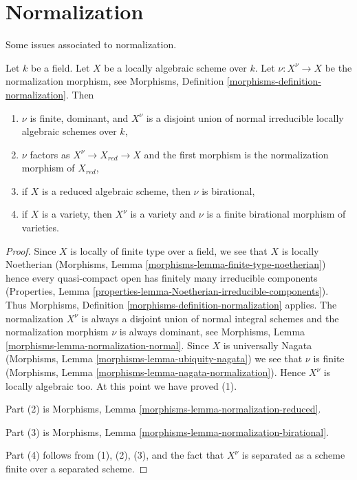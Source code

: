 \section{Normalization}
\label{section-normalization}

\noindent
Some issues associated to normalization.

\begin{lemma}
\label{lemma-normalization-locally-algebraic}
Let $k$ be a field. Let $X$ be a locally algebraic scheme over $k$.
Let $\nu : X^\nu \to X$ be the normalization morphism, see
Morphisms, Definition \ref{morphisms-definition-normalization}.
Then
\begin{enumerate}
\item $\nu$ is finite, dominant, and $X^\nu$ is a disjoint
union of normal irreducible locally algebraic schemes over $k$,
\item $\nu$ factors as $X^\nu \to X_{red} \to X$ and the first
morphism is the normalization morphism of $X_{red}$,
\item if $X$ is a reduced algebraic scheme, then $\nu$ is
birational,
\item if $X$ is a variety, then $X^\nu$ is a variety and
$\nu$ is a finite birational morphism of varieties.
\end{enumerate}
\end{lemma}

\begin{proof}
Since $X$ is locally of finite type over a field, we see that
$X$ is locally Noetherian
(Morphisms, Lemma \ref{morphisms-lemma-finite-type-noetherian})
hence every quasi-compact open has finitely many irreducible
components (Properties, Lemma
\ref{properties-lemma-Noetherian-irreducible-components}).
Thus Morphisms, Definition \ref{morphisms-definition-normalization} applies.
The normalization $X^\nu$ is always a disjoint union of normal integral
schemes and the normalization morphism $\nu$ is always dominant, see
Morphisms, Lemma \ref{morphisms-lemma-normalization-normal}.
Since $X$ is universally Nagata
(Morphisms, Lemma \ref{morphisms-lemma-ubiquity-nagata})
we see that $\nu$ is finite
(Morphisms, Lemma \ref{morphisms-lemma-nagata-normalization}).
Hence $X^\nu$ is locally algebraic too.
At this point we have proved (1).

\medskip\noindent
Part (2) is Morphisms, Lemma \ref{morphisms-lemma-normalization-reduced}.

\medskip\noindent
Part (3) is Morphisms, Lemma \ref{morphisms-lemma-normalization-birational}.

\medskip\noindent
Part (4) follows from (1), (2), (3), and the fact that $X^\nu$ is
separated as a scheme finite over a separated scheme.
\end{proof}

